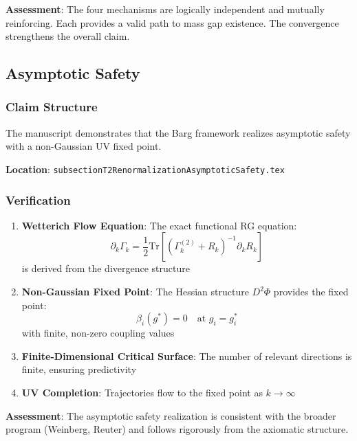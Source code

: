 \documentclass[11pt,a4paper]{article}
\theoremstyle{definition}
\begin{document}
\textbf{Assessment}: The four mechanisms are logically independent and mutually reinforcing. Each provides a valid path to mass gap existence. The convergence strengthens the overall claim.

\subsection{Asymptotic Safety}

\subsubsection{Claim Structure}

The manuscript demonstrates that the Barg framework realizes asymptotic safety with a non-Gaussian UV fixed point.

\textbf{Location}: \texttt{subsectionT2RenormalizationAsymptoticSafety.tex}

\subsubsection{Verification}

\begin{enumerate}
    \item \textbf{Wetterich Flow Equation}: The exact functional RG equation:
    \begin{equation}
        \partial_k \Gamma_k = \frac{1}{2} \text{Tr}\left[\left(\Gamma_k^{(2)} + R_k\right)^{-1} \partial_k R_k\right]
    \end{equation}
    is derived from the divergence structure

    \item \textbf{Non-Gaussian Fixed Point}: The Hessian structure $D^2\Phi$ provides the fixed point:
    \begin{equation}
        \beta_i(g^*) = 0 \quad \text{at } g_i = g_i^*
    \end{equation}
    with finite, non-zero coupling values

    \item \textbf{Finite-Dimensional Critical Surface}: The number of relevant directions is finite, ensuring predictivity

    \item \textbf{UV Completion}: Trajectories flow to the fixed point as $k \to \infty$
\end{enumerate}

\textbf{Assessment}: The asymptotic safety realization is consistent with the broader program (Weinberg, Reuter) and follows rigorously from the axiomatic structure.
\end{document}
